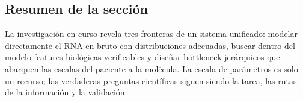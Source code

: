 \subsection{Resumen de la sección}

La investigación en curso revela tres fronteras de un sistema unificado: modelar directamente el RNA en bruto con distribuciones adecuadas, buscar dentro del modelo features biológicas verificables y diseñar bottleneck jerárquicos que abarquen las escalas del paciente a la molécula. La escala de parámetros es solo un recurso; las verdaderas preguntas científicas siguen siendo la tarea, las rutas de la información y la validación.
